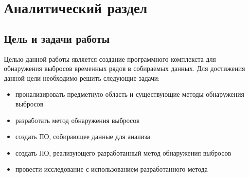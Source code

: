 \chapter{Аналитический раздел}
\label{cha:analysis}
\section{Цель и задачи работы}
Целью данной работы является создание программного комплекста для обнаружения выбросов временных рядов в собираемых данных.
Для достижения данной цели необходимо решить следующие задачи:
\begin{itemize}
	\item пронализировать предметную область и существующие методы обнаружения выбросов
	\item разработать метод обнаружения выбросов
	\item создать ПО, собирающее данные для анализа
	\item создать ПО, реализующего  разработанный метод обнаружения выбросов
	\item провести исследование с использованием разработанного метода
	
\end{itemize}

